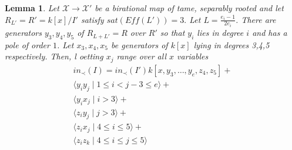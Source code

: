 \documentclass{amsart}
\theoremstyle{plain}
\newtheorem{lem}[thm]{Lemma}
\theoremstyle{definition}
\theoremstyle{remark}
\numberwithin{equation}{section}
\newcommand \sx{\mathscr X}
\newcommand \halfcan{L}
\newcommand \subhalf[1]{\frac{e_{#1} - 1}{2e_{#1}}}
\begin{document}
\begin{lem}
\label{sat_three_induction}
Let $\sx \rightarrow \sx'$ be a birational map of tame, separably rooted  and let $R_{\halfcan'} = R' = k[x]/I'$ satisfy $sat(Eff(\halfcan')) = 3.$ Let $\halfcan = \subhalf i$. There are generators $y_3,y_4,y_5$ of $R_{\halfcan+\halfcan'}= R$ over $R'$ so that $y_i$ lies in degree $i$ and has a pole of order $1$.  
Let $x_3,x_4,x_5$ be generators of $k[x]$ lying in degrees 3,4,5 respectively.  Then, l oetting $x_j$ range over all $x$ variables
\begin{align*}
	in_\prec(I) = in_\prec(I')k[x,y_3,\ldots, y_e,z_4,z_5] + \\
	\langle y_i y_j \mid 1 \leq i < j-3 \leq e \rangle +\\
	\langle y_i x_j \mid i > 3 \rangle +\\
	\langle z_i y_j \mid j > 3 \rangle  +\\
	\langle z_i x_j \mid 4 \leq i \leq 5\rangle + \\
	\langle z_iz_k \mid 4 \leq i \leq j \leq 5 \rangle 
\end{align*}

\end{lem}
\end{document}

